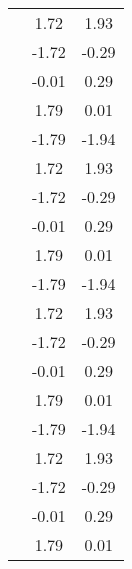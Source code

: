 \begin{table}
\begin{tabular}{c|cc|}
\multicolumn{1}{|c|}{} & \multicolumn{1}{|c|}{      1.72} & \multicolumn{1}{|c|}{      1.93} \\ 
\multicolumn{1}{|c|}{} & \multicolumn{1}{|c|}{     -1.72} & \multicolumn{1}{|c|}{     -0.29} \\ 
\multicolumn{1}{|c|}{} & \multicolumn{1}{|c|}{     -0.01} & \multicolumn{1}{|c|}{      0.29} \\ 
\multicolumn{1}{|c|}{} & \multicolumn{1}{|c|}{      1.79} & \multicolumn{1}{|c|}{      0.01} \\ 
\multicolumn{1}{|c|}{} & \multicolumn{1}{|c|}{     -1.79} & \multicolumn{1}{|c|}{     -1.94} \\ 
\multicolumn{1}{|c|}{} & \multicolumn{1}{|c|}{      1.72} & \multicolumn{1}{|c|}{      1.93} \\ 
\multicolumn{1}{|c|}{} & \multicolumn{1}{|c|}{     -1.72} & \multicolumn{1}{|c|}{     -0.29} \\ 
\multicolumn{1}{|c|}{} & \multicolumn{1}{|c|}{     -0.01} & \multicolumn{1}{|c|}{      0.29} \\ 
\multicolumn{1}{|c|}{} & \multicolumn{1}{|c|}{      1.79} & \multicolumn{1}{|c|}{      0.01} \\ 
\multicolumn{1}{|c|}{} & \multicolumn{1}{|c|}{     -1.79} & \multicolumn{1}{|c|}{     -1.94} \\ 
\multicolumn{1}{|c|}{} & \multicolumn{1}{|c|}{      1.72} & \multicolumn{1}{|c|}{      1.93} \\ 
\multicolumn{1}{|c|}{} & \multicolumn{1}{|c|}{     -1.72} & \multicolumn{1}{|c|}{     -0.29} \\ 
\multicolumn{1}{|c|}{} & \multicolumn{1}{|c|}{     -0.01} & \multicolumn{1}{|c|}{      0.29} \\ 
\multicolumn{1}{|c|}{} & \multicolumn{1}{|c|}{      1.79} & \multicolumn{1}{|c|}{      0.01} \\ 
\multicolumn{1}{|c|}{} & \multicolumn{1}{|c|}{     -1.79} & \multicolumn{1}{|c|}{     -1.94} \\ 
\multicolumn{1}{|c|}{} & \multicolumn{1}{|c|}{      1.72} & \multicolumn{1}{|c|}{      1.93} \\ 
\multicolumn{1}{|c|}{} & \multicolumn{1}{|c|}{     -1.72} & \multicolumn{1}{|c|}{     -0.29} \\ 
\multicolumn{1}{|c|}{} & \multicolumn{1}{|c|}{     -0.01} & \multicolumn{1}{|c|}{      0.29} \\ 
\multicolumn{1}{|c|}{} & \multicolumn{1}{|c|}{      1.79} & \multicolumn{1}{|c|}{      0.01} \\ 

\end{tabular}
\end{table}
